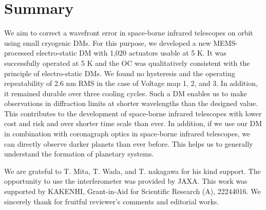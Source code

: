 \documentclass[a4paper]{article}
\begin{document}
\section{Summary}
We aim to correct a wavefront error in space-borne infrared telescopes on orbit using small cryogenic DMs. For this purpose, we developed a new MEMS-processed electro-static DM with 1,020 actuators usable at 5 K. It was successfully operated at 5 K and the OC was qualitatively consistent with the principle of electro-static DMs. We found no hysteresis and the operating repeatability of 2.6 nm RMS in the case of Voltage map 1, 2, and 3. In addition, it remained durable over three cooling cycles. Such a DM enables us to make observations in diffraction limits at shorter wavelengths than the designed value. This contributes to the development of space-borne infrared telescopes with lower cost and risk and over shorter time scale than ever. In addition, if we use our DM in combination with coronagraph optics in space-borne infrared telescopes, we can directly observe darker planets than ever before. This helps us to generally understand the formation of planetary systems.

\vspace*{2.0\baselineskip}
We are grateful to T. Mita, T. Wada, and T. nakagawa for his kind support. The opportunity to use the interferometer was provided by JAXA. This work was supported by KAKENHI, Grant-in-Aid for Scientific Research (A), 22244016. We sincerely thank for fruitful reviewer's comments and editorial works.
\end{document}
